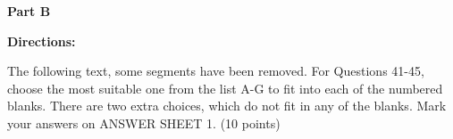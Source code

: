 
\textbf{Part B}

\textbf{Directions:}

The following text, some segments have been removed. For Questions 41-45, choose the most suitable one from the list A-G to fit into each of the numbered blanks. There are two extra choices, which do not fit in any of the blanks. Mark your answers on ANSWER SHEET 1. (10 points)

\vspace{6pt}